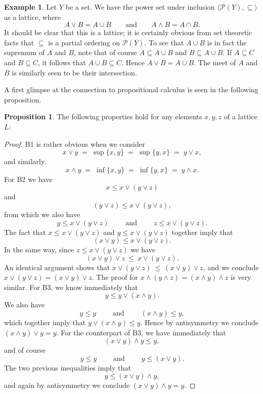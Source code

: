 \documentclass[11pt,titlepage]{article}
\newcommand{\spand}{\qquad\text{ and }\qquad}
\theoremstyle{definition}
\newtheorem{example}[definition]{Example}
\newtheorem{proposition}[definition]{Proposition}
\begin{document}
\begin{example}\label{sets} Let $Y$ be a set. We have the power set under inclusion $\langle \mathcal{P}(Y), \subseteq\rangle$ as a lattice, where $$A\lor B = A \cup B \qquad\text{and}\qquad A\land B=A\cap B.$$ It should be clear that this is a lattice; it is certainly obvious from set theoretic facts that $\subseteq$ is a partial ordering on $\mathcal{P}(Y)$. To see that $A\cup B$ is in fact the supremum of $A$ and $B$, note that of course $A\subseteq A \cup B$ and $B\subseteq A\cup B$. If $A\subseteq C$ and $B\subseteq C$, it follows that $A\cup B\subseteq C$. Hence $A\lor B = A\cup B$. The meet of $A$ and $B$ is similarly seen to be their intersection.
\end{example}

A first glimpse at the connection to propositional calculus is seen in the following proposition.

\begin{proposition}\label{3B} The following properties hold for any elements $x,y,z$ of a lattice $L$:
 \end{proposition}
\begin{proof} B1 is rather obvious when we consider $$x\lor y \;=\; \sup\{x,y\}\;=\;\sup\{y, x\} \;=\; y\lor x,$$ and similarly $$x\land y \;=\; \inf\{x,y\}\; =\; \inf\{y,x\} \;=\; y\land x.$$ For B2 we have $$x\leq x \lor (y\lor z)$$ and $$ (y\lor z) \leq x\lor (y\lor z),$$ from which we also have $$y\leq x \lor (y\lor z) \spand z\leq x\lor(y\lor z).$$ The fact that $x\leq x \lor (y\lor z)$ and $y\leq x \lor (y\lor z)$ together imply that $$(x\lor y)\leq x\lor (y\lor z).$$ In the same way, since $z\leq x\lor(y\lor z)$ we have $$(x\lor y) \lor z \ \leq\  x \lor (y\lor z).$$ An identical argument shows that $x \lor (y\lor z) \ \leq \ (x\lor y) \lor z $, and we conclude $x\lor (y\lor z)=(x\lor y)\lor z$. The proof for $x\land (y\land z)=(x\land y)\land z $ is very similar. For B3, we know immediately that $$y\leq y \lor (x\land y).$$ We also have $$y\leq y\spand (x\land y)\leq y,$$ which together imply that $y\lor (x\land y) \leq y$. Hence by antisymmetry we conclude $(x\land y) \lor y = y.$ For the counterpart of B3, we have immediately that $$(x\lor y)\land y \leq y,$$ and of course $$y\leq y \spand y\leq(x\lor y).$$ The two previous inequalities imply that $$y\leq (x\lor y)\land y,$$ and again by antisymmetry we conclude $(x\lor y)\land y= y$.\end{proof}
\end{document}
